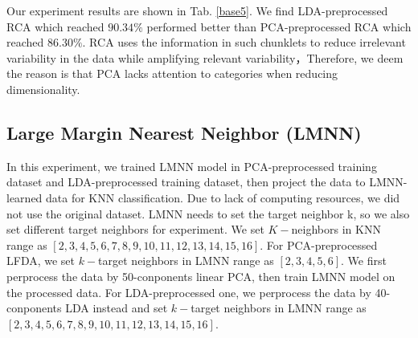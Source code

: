 \documentclass[conference]{IEEEtran}
\begin{document}
Our experiment results are shown in Tab. \ref{base5}. We find LDA-preprocessed RCA which reached $90.34\%$ performed better than PCA-preprocessed RCA which reached $86.30\%$. RCA uses the information in such chunklets to reduce irrelevant variability in the data while amplifying relevant variability，Therefore, we deem the reason is that PCA lacks attention to categories when reducing dimensionality.
\subsection{Large Margin Nearest Neighbor (LMNN)}

In this experiment, we trained LMNN model in PCA-preprocessed training dataset and LDA-preprocessed training dataset, then project the data to LMNN-learned data for KNN classification. Due to lack of computing resources, we did not use the original dataset. LMNN needs to set the target neighbor k, so we also set different target neighbors for experiment. We set $K-$neighbors in KNN range as $[2, 3, 4, 5, 6, 7, 8, 9, 10, 11, 12, 13, 14, 15, 16]$. For PCA-preprocessed LFDA, we set $k-$target neighbors in LMNN range as $[2,3,4,5,6]$. We first perprocess the data by 50-conponents linear PCA, then train LMNN model on the processed data. For LDA-preprocessed one, we perprocess the data by 40-conponents LDA instead and set $k-$target neighbors in LMNN range as $[2, 3, 4, 5, 6, 7, 8, 9, 10, 11, 12, 13, 14, 15, 16]$. 
\end{document}
